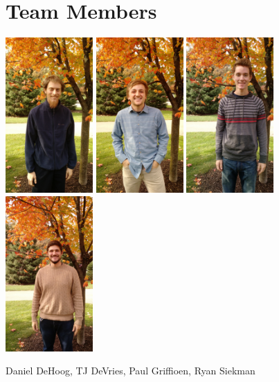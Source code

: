 \documentclass[letterpaper,11pt]{./templates/texMemo} %
\begin{document}
\maketitle 

\section{Team Members}

\centerline{\includegraphics[width=0.25\textwidth]{dan.jpg} \includegraphics[width=0.25\textwidth]{tj.jpg} \includegraphics[width=0.25\textwidth]{paul.jpg} \includegraphics[width=0.25\textwidth]{ryan.jpg}}
\centerline{Daniel DeHoog, TJ DeVries, Paul Griffioen, Ryan Siekman}
\end{document}
